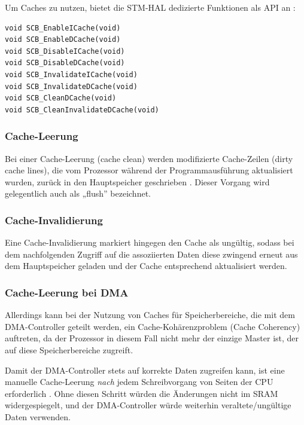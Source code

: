 Um Caches zu nutzen, bietet die STM-\ac{HAL} dedizierte Funktionen als API an
\cite[S. 4]{an4839}:

\begin{code}
\begin{verbatim}
void SCB_EnableICache(void)
void SCB_EnableDCache(void)
void SCB_DisableICache(void)
void SCB_DisableDCache(void)
void SCB_InvalidateICache(void)
void SCB_InvalidateDCache(void)
void SCB_CleanDCache(void)
void SCB_CleanInvalidateDCache(void)
\end{verbatim}
\end{code}

\subsubsection{Cache-Leerung}

Bei einer Cache-Leerung (cache clean) werden modifizierte Cache-Zeilen (dirty
cache lines), die vom Prozessor während der Programmausführung aktualisiert
wurden, zurück in den Hauptspeicher geschrieben \cite[S. 4]{an4839}. Dieser
Vorgang wird gelegentlich auch als „flush” bezeichnet.

\subsubsection{Cache-Invalidierung}

Eine Cache-Invalidierung markiert hingegen den Cache als ungültig, sodass bei
dem nachfolgenden Zugriff auf die assoziierten Daten diese zwingend erneut aus
dem Hauptspeicher geladen und der Cache entsprechend aktualisiert werden.

\subsubsection{Cache-Leerung bei DMA} \label{sec:cache_clean}

Allerdings kann bei der Nutzung von Caches für Speicherbereiche, die mit dem
DMA-Controller geteilt werden, ein Cache-Kohärenzproblem (Cache Coherency)
auftreten, da der Prozessor in diesem Fall nicht mehr der einzige Master ist,
der auf diese Speicherbereiche zugreift.

Damit der DMA-Controller stets auf korrekte Daten zugreifen kann, ist eine
manuelle Cache-Leerung \textit{nach} jedem Schreibvorgang von Seiten der CPU
erforderlich \cite[S. 6]{an4839}. Ohne diesen Schritt würden die Änderungen
nicht im SRAM widergespiegelt, und der DMA-Controller würde weiterhin
veraltete/ungültige Daten verwenden.

